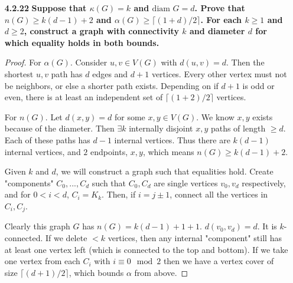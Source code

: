 \documentclass[11pt]{amsart}
\theoremstyle{plain}
\theoremstyle{definition}
\theoremstyle{example}
\begin{document}
\begin{enumerate}[\qquad]
\begin{proof}
\end{proof}

\bigskip




\item[\bf 4.2.22] {\bf Suppose that $\kappa(G) = k$ and $\text{diam } G = d$.  Prove that $n(G)\geq k(d-1)+2$ and $\alpha(G)\geq \lceil(1+d)/2\rceil$. For each $k\geq 1$ and $d\geq 2$, construct a graph with connectivity $k$ and diameter $d$ for which equality holds in both bounds.}\\

\begin{proof}For $\alpha(G)$. Consider $u,v \in V(G)$ with $d(u,v) = d$. Then the shortest $u,v$ path has $d$ edges and $d+1$ vertices. Every other vertex must not be neighbors, or else a shorter path exists. Depending on if $d+1$ is odd or even, there is at least an independent set of $\lceil(1+2)/2\rceil$ vertices.

For $n(G)$. Let $d(x,y) = d$ for some $x,y \in V(G)$. We know $x,y$ exists because of the diameter. Then $\exists k$ internally disjoint $x,y$ paths of length $\geq d$. Each of these paths has $d-1$ internal vertices. Thus there are $k(d-1)$ internal vertices, and $2$ endpoints, $x,y$, which means $n(G) \geq k(d-1)+2$.

Given $k$ and $d$, we will construct a graph such that equalities hold. Create "components" $C_0,...,C_d$ such that $C_0,C_d$ are single vertices $v_0,v_d$ respectively, and for $0<i<d$, $C_i = K_k$. Then, if $i=j\pm1$, connect all the vertices in $C_i, C_j$. 

Clearly this graph $G$ has $n(G) = k(d-1)+1+1$. $d(v_0,v_d) = d$. It is $k$-connected. If we delete $<k$ vertices, then any internal "component" still has at least one vertex left (which is connected to the top and bottom). If we take one vertex from each $C_i$ with $i \equiv 0 \mod{2}$ then we have a vertex cover of size $\lceil(d+1)/2\rceil$, which bounds $\alpha$ from above. 

\end{proof}

\bigskip





\end{enumerate}
\end{document}
